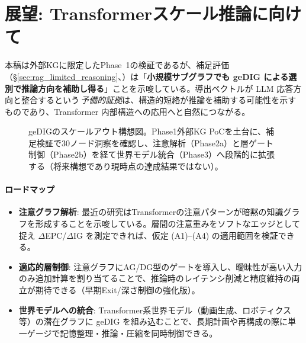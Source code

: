 \documentclass[ja=standard,xelatex]{bxjsarticle}
\begin{document}

\section{展望: Transformerスケール推論に向けて}
\label{sec:transformer_outlook}

本稿は外部KGに限定したPhase~1の検証であるが、補足評価（\S\ref{sec:rag_limited_reasoning}、）は「\textbf{小規模サブグラフでも geDIG による選別で推論方向を補助し得る}」ことを示唆している。導出ベクトルが LLM 応答方向と整合するという\,\emph{予備的証拠}は、構造的短絡が推論を補助する可能性を示すものであり、Transformer 内部構造への応用へと自然につながる。

\begin{figure}[H]
  \centering
  \caption{geDIGのスケールアウト構想図。Phase1外部KG PoCを土台に、補足検証で30ノード洞察を確認し、注意解析（Phase2a）と層ゲート制御（Phase2b）を経て世界モデル統合（Phase3）へ段階的に拡張する（将来構想であり現時点の達成結果ではない）。}
  \label{fig:gedig_roadmap}
\end{figure}

\paragraph{ロードマップ}
\begin{itemize}[leftmargin=1.8em]
  \item \textbf{注意グラフ解析}: 最近の研究はTransformerの注意パターンが暗黙の知識グラフを形成することを示唆している。層間の注意重みをソフトなエッジとして捉え $\Delta$EPC/$\Delta$IG を測定できれば、仮定 (A1)--(A4) の適用範囲を検証できる。
  \item \textbf{適応的層制御}: 注意グラフにAG/DG型のゲートを導入し、曖昧性が高い入力のみ追加計算を割り当てることで、推論時のレイテンシ削減と精度維持の両立が期待できる（早期Exit/深さ制御の強化版）。
  \item \textbf{世界モデルへの統合}: Transformer系世界モデル（動画生成、ロボティクス等）の潜在グラフに geDIG を組み込むことで、長期計画や再構成の際に単一ゲージで記憶整理・推論・圧縮を同時制御できる。
\end{itemize}
\end{document}
